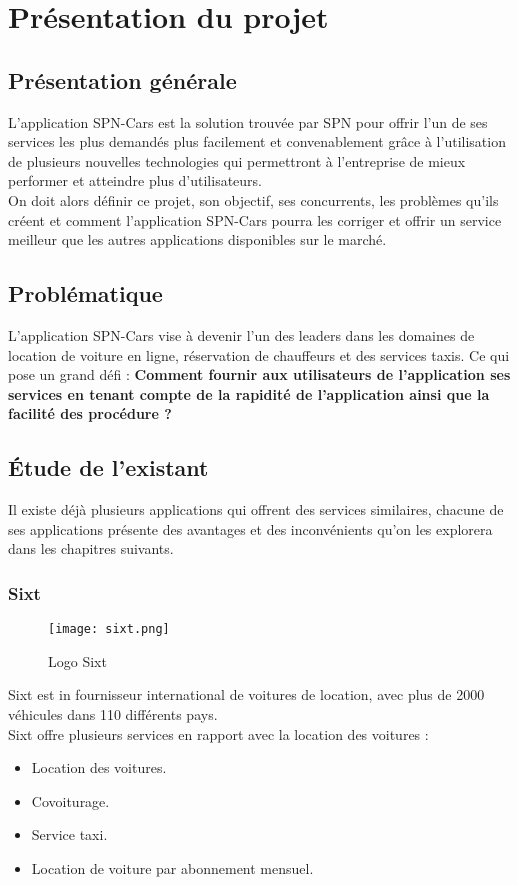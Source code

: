\section{Présentation du projet}
\subsection{Présentation générale}
L'application SPN-Cars est la solution trouvée par SPN pour offrir l'un de ses services les plus demandés plus facilement et convenablement grâce à l'utilisation de plusieurs nouvelles technologies qui permettront à l'entreprise de mieux performer et atteindre plus d'utilisateurs.\\
\noindent On doit alors définir ce projet, son objectif, ses concurrents, les problèmes qu'ils créent et comment l'application SPN-Cars pourra les corriger et offrir un service meilleur que les autres applications disponibles sur le marché.
\subsection{Problématique}
L'application SPN-Cars vise à devenir l'un des leaders dans les domaines de location de voiture en ligne, réservation de chauffeurs et des services taxis. Ce qui pose un grand défi : \textbf{Comment fournir aux utilisateurs de l'application ses services en tenant compte de la rapidité de l'application ainsi que la facilité des procédure ?}
\subsection{Étude de l'existant}
Il existe déjà plusieurs applications qui offrent des services similaires, chacune de ses applications présente des avantages et des inconvénients qu'on les explorera dans les chapitres suivants.
\subsubsection{Sixt}
\vspace{1cm}
\begin{figure}[H]
    \centering
    \texttt{[image: sixt.png]}
    \vspace{0.5cm}
    \caption{Logo Sixt}
    \label{fig:sixt_logo}
\end{figure}
\vspace{1cm}
Sixt \cite{sixt} est in fournisseur international de voitures de location, avec plus de 2000 véhicules dans 110 différents pays.\\
\noindent Sixt offre plusieurs services en rapport avec la location des voitures :
\begin{itemize}
    \item Location des voitures.
    \item Covoiturage.
    \item Service taxi.
    \item Location de voiture par abonnement mensuel.
\end{itemize}

